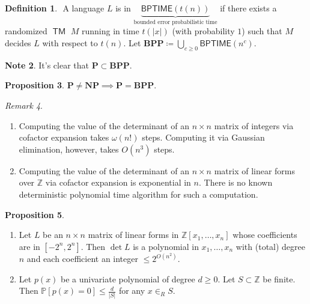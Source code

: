 \documentclass[10pt,letterpaper,cm]{nupset}
\theoremstyle{definition}
\newtheorem{definition}{Definition}[subsection]
\newtheorem{note}[definition]{Note}
\theoremstyle{theorem}
\newtheorem{prop}[definition]{Proposition}
\theoremstyle{remark}
\newtheorem{remark}[definition]{Remark}
\newcommand{\Z}{\mathbb Z}
\newcommand{\1}{\mathbf{1}}
\newcommand{\0}{\vec 0}
\DeclareMathOperator{\TM}{\mathsf{TM}}
\begin{document}
\begin{definition} $ $
A language $L$ is in \textit{$\underbrace{\mathsf{BPTIME}(t(n))}_{\text{bounded error probabilistic time}}$} if there exists a randomized $\TM$ $M$ running in time $t(\lvert{x}\rvert)$ (with probability $1$) such that $M$ decides $L$ with respect to $t(n)$. Let $\mathbf{BPP} \coloneqq \bigcup_{c\geq 0} \mathsf{BPTIME}(n^c)$.
\end{definition}

\begin{note}
It's clear that $\mathbf{P} \subset \mathbf{BPP}$.
\end{note}

\begin{prop}
$\mathbf{P} \ne \mathbf{NP} \implies \mathbf{P} = \mathbf{BPP}$.
\end{prop}

\begin{remark} $ $
\begin{enumerate}
\item Computing the value of the determinant of an $n\times n$ matrix of integers via cofactor expansion takes $\omega(n!)$ steps. Computing it via Gaussian elimination, however, takes $O(n^3)$ steps. 
\item Computing the value of the determinant of an $n\times n$ matrix of linear forms over $\Z$ via cofactor expansion is exponential in $n$. There is no known deterministic polynomial time algorithm for such a computation.
\end{enumerate}
\end{remark}

\begin{prop}\label{poly} $ $
\begin{enumerate}[label=(\alph*)]
\item Let $L$ be an $n\times n$ matrix of linear forms in $\Z[x_1, \ldots, x_n]$ whose coefficients are in $[{-}2^n, 2^n]$. Then $\det{L}$ is a polynomial in $x_1, \ldots, x_n$ with (total) degree $n$ and each coefficient an integer $\leq 2^{O(n^2)}$.
\item Let $p(x)$ be a univariate polynomial of degree $d \geq 0$. Let $S\subset \Z$ be finite. Then $\mathbb{P}[p(x) =0] \leq \frac{d}{|S|}$ for any $x\in_R S$.
\end{enumerate}
\end{prop}
\end{document}
